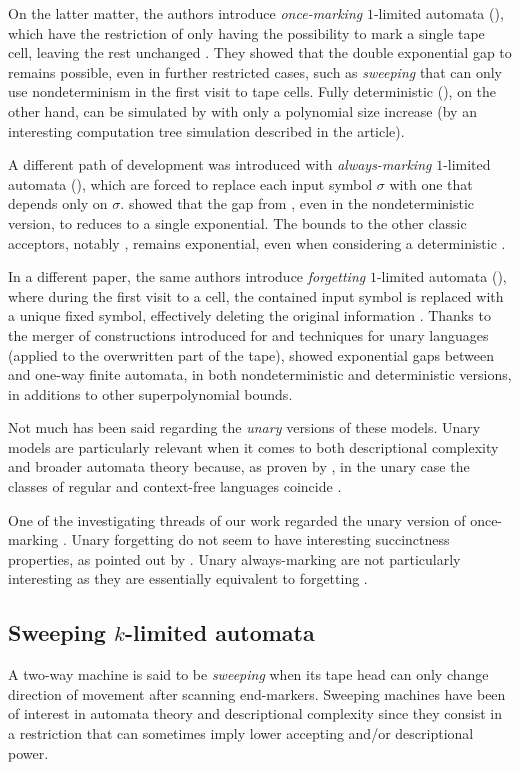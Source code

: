 On the latter matter, the authors introduce \emph{once-marking} $1$-limited automata (\OMOLA), which have the restriction of only having the possibility to mark a single tape cell, leaving the rest unchanged \cite{PigPri23}.
They showed that the double exponential gap to \ODFA remains possible, even in further restricted cases, such as \emph{sweeping} \OMOLA that can only use nondeterminism in the first visit to tape cells.
Fully deterministic \OMOLA (\OMODLA), on the other hand, can be simulated by \TDFAs with only a polynomial size increase (by an interesting computation tree simulation described in the article).

A different path of development was introduced with \emph{always-marking} $1$-limited automata (\AMOLA), which are forced to replace each input symbol $\sigma$ with one that depends only on $\sigma$.
\citeauthor{PigPri23a} showed that the gap from \AMOLA, even in the nondeterministic version, to \DFA reduces to a single exponential.
The bounds to the other classic acceptors, notably \TNFA, remains exponential, even when considering a deterministic \AMOLA.

In a different paper, the same authors introduce \emph{forgetting} $1$-limited automata (\FOLA), where during the first visit to a cell, the contained input symbol is replaced with a unique fixed symbol, effectively deleting the original information \cite{PigPri23,JanMra+93}.
Thanks to the merger of constructions introduced for \AMOLA and techniques for unary languages (applied to the overwritten part of the tape), \citeauthor{PigPri23} showed exponential gaps between \AMOLA and one-way finite automata, in both nondeterministic and deterministic versions, in additions to other superpolynomial bounds.

Not much has been said regarding the \emph{unary} versions of these models.
Unary models are particularly relevant when it comes to both descriptional complexity and broader automata theory because, as proven by \citeauthor{GinRic62}, in the unary case the classes of regular and context-free languages coincide \cite{GinRic62}.

One of the investigating threads of our work regarded the unary version of once-marking \OLAs.
Unary forgetting \OLA do not seem to have interesting succinctness properties, as pointed out by \citeauthor{PigPri23} \cite{PigPri23}.
Unary always-marking \OLA are not particularly interesting as they are essentially equivalent to forgetting \OLA.


\subsection{Sweeping \texorpdfstring{$k$}{k}-limited automata}
A two-way machine is said to be \emph{sweeping} when its tape head can only change direction of movement after scanning end-markers.
Sweeping machines have been of interest in automata theory and descriptional complexity since they consist in a restriction that can sometimes imply lower accepting and/or descriptional power.

